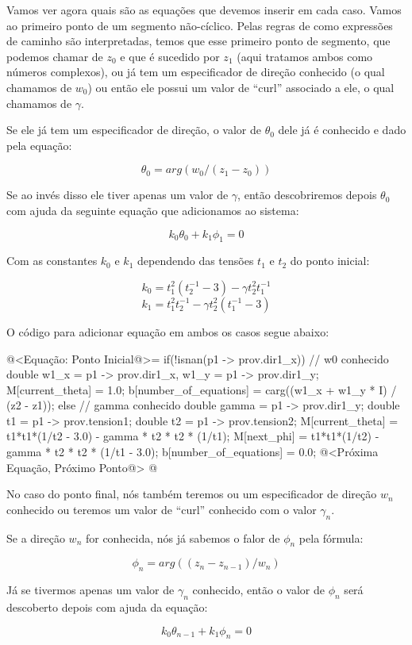 Vamos ver agora quais são as equações que devemos inserir em cada
caso. Vamos ao primeiro ponto de um segmento não-cíclico. Pelas regras
de como expressões de caminho são interpretadas, temos que esse
primeiro ponto de segmento, que podemos chamar de $z_0$ e que é
sucedido por $z_1$ (aqui tratamos ambos como números complexos), ou já
tem um especificador de direção conhecido (o qual chamamos de $w_0$)
ou então ele possui um valor de ``curl'' associado a ele, o qual
chamamos de $\gamma$.

Se ele já tem um especificador de direção, o valor de $\theta_0$ dele
já é conhecido e dado pela equação:

$$
\theta_0 = arg(w_0/(z_1-z_0))
$$

Se ao invés disso ele tiver apenas um valor de $\gamma$, então
descobriremos depois $\theta_0$ com ajuda da seguinte equação que
adicionamos ao sistema:

$$
k_0\theta_0+k_1\phi_1=0
$$

Com as constantes $k_0$ e $k_1$ dependendo das tensões $t_1$ e
$t_2$ do ponto inicial:

$$
k_0=t_1^2(t_2^{-1}-3)-\gamma t_2^2t_1^{-1}
$$
$$
k_1=t_1^2t_2^{-1}-\gamma t_2^2(t_1^{-1}-3)
$$

O código para adicionar equação em ambos os casos segue abaixo:

\iniciocodigo
@<Equação: Ponto Inicial@>=
if(!isnan(p1 -> prov.dir1_x)){ // w0 conhecido
  double w1_x = p1 -> prov.dir1_x, w1_y = p1 -> prov.dir1_y;
  M[current_theta] = 1.0;
  b[number_of_equations] = carg((w1_x + w1_y * I) / (z2 - z1));
}
else{ // gamma conhecido
  double gamma = p1 -> prov.dir1_y;
  double t1 = p1 -> prov.tension1;
  double t2 = p1 -> prov.tension2;
  M[current_theta] = t1*t1*(1/t2 - 3.0) - gamma * t2 * t2 * (1/t1);
  M[next_phi] = t1*t1*(1/t2) - gamma * t2 * t2 * (1/t1 - 3.0);
  b[number_of_equations] = 0.0;
}
@<Próxima Equação, Próximo Ponto@>
@
\fimcodigo

No caso do ponto final, nós também teremos ou um especificador de
direção $w_n$ conhecido ou teremos um valor de ``curl'' conhecido com
o valor $\gamma_n$.

Se a direção $w_n$ for conhecida, nós já sabemos o falor de $\phi_n$
pela fórmula:

$$
\phi_n = arg((z_n - z_{n-1})/w_n)
$$

Já se tivermos apenas um valor de $\gamma_n$ conhecido, então o valor
de $\phi_n$ será descoberto depois com ajuda da equação:

$$
k_0\theta_{n-1}+k_1\phi_{n}=0
$$

